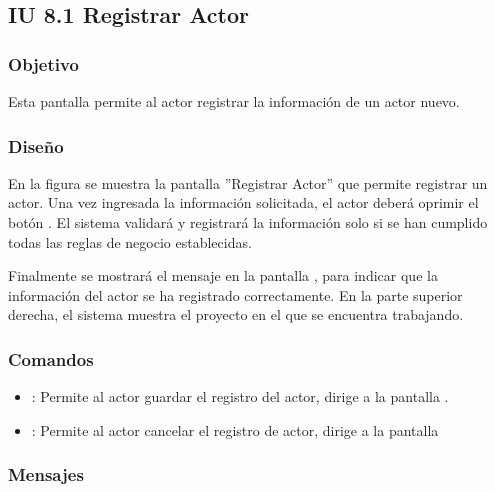 \subsection{IU 8.1 Registrar Actor}

\subsubsection{Objetivo}
	Esta pantalla permite al actor registrar la información de un actor nuevo.
\subsubsection{Diseño}
	En la figura  se muestra la pantalla ''Registrar Actor'' que permite registrar un actor.
	Una vez ingresada la información solicitada, el actor deberá oprimir el botón  . El sistema validará y registrará la información solo si se han cumplido todas las reglas de negocio establecidas.
	
	Finalmente se mostrará el mensaje  en la pantalla , para indicar que la información del actor se ha registrado correctamente.
	En la parte superior derecha, el sistema muestra el proyecto en el que se encuentra trabajando.

\subsubsection{Comandos}
\begin{itemize}
	\item {}: Permite al actor guardar el registro del actor, dirige a la pantalla .
	\item {}: Permite al actor cancelar el registro de actor, dirige a la pantalla 
\end{itemize}

\subsubsection{Mensajes}

